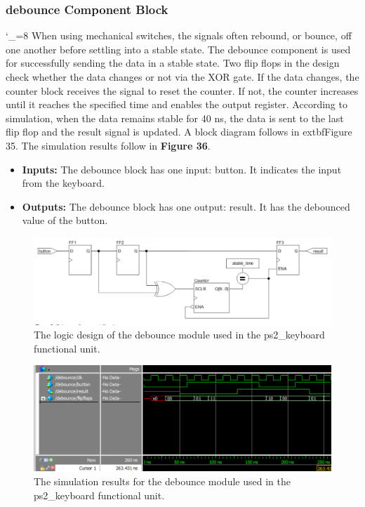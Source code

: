 \documentclass[a4paper]{article}
\begin{document}
\subsubsection{debounce Component Block}
\catcode`_=8
When using mechanical switches, the signals often rebound, or bounce, off one another before settling into a stable state. The debounce component is used for successfully sending the data in a stable state. Two flip flops in the design check whether the data changes or not via the XOR gate. If the data changes, the counter block receives the signal to reset the counter. If not, the counter increases until it reaches the specified time and enables the output register. According to simulation, when the data remains stable for 40 ns, the data is sent to the last flip flop and the result signal is updated.  A block diagram follows in 	extbf{Figure 35}.  The simulation results follow in \textbf{Figure 36}.
\begin{itemize}
\item \textbf{Inputs:  } The debounce block has one input: button. It indicates the input from the keyboard.
\item \textbf{Outputs: } The debounce block has one output: result. It has the debounced value of the button.
\end{itemize}
\begin{figure}[h]
\centering
\includegraphics[width=.8\textwidth]{functional_units/ps2_keyboard/individual_blocks/debounce_block.png}
\caption{The logic design of the debounce module used in the ps2\_keyboard functional unit.}
\end{figure}
\begin{figure}[h]
\centering
\includegraphics[width=.98\textwidth]{functional_units/ps2_keyboard/individual_blocks/debounce_sim.png}
\caption{The simulation results for the debounce module used in the ps2\_keyboard functional unit.}
\end{figure}
\clearpage
\end{document}
